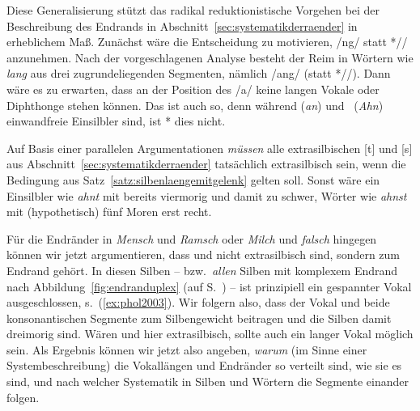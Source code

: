 Diese Generalisierung stützt das radikal reduktionistische Vorgehen bei der Beschreibung des Endrands in Abschnitt~\ref{sec:systematikderraender} in erheblichem Maß.
Zunächst wäre die Entscheidung zu motivieren, /ng/ statt *// anzunehmen.
Nach der vorgeschlagenen Analyse besteht der Reim in Wörtern wie \textit{lang} aus drei zugrundeliegenden Segmenten, nämlich /ang/ (statt *//).
Dann wäre es zu erwarten, dass an der Position des /a/ keine langen Vokale oder Diphthonge stehen können.
Das ist auch so, denn während \textipa{[Pan]} (\textit{an}) und\ \textipa{[Pa:n]} (\textit{Ahn}) einwandfreie Einsilbler sind, ist *\textipa{[Pa:N]} dies nicht.

Auf Basis einer parallelen Argumentationen \textit{müssen} alle extrasilbischen [t] und [s] aus Abschnitt~\ref{sec:systematikderraender} tatsächlich extrasilbisch sein, wenn die Bedingung aus Satz~\ref{satz:silbenlaengemitgelenk} gelten soll.
Sonst wäre ein Einsilbler wie \textit{ahnt} mit \textipa{[Pa:nt]} bereits viermorig und damit zu schwer, Wörter wie \textit{ahnst} mit (hypothetisch) fünf Moren erst recht.

Für die Endränder in \textit{Mensch} und \textit{Ramsch} oder \textit{Milch} und \textit{falsch} hingegen können wir jetzt argumentieren, dass \textipa{[S]} und \textipa{[\c{c}]} nicht extrasilbisch sind, sondern zum Endrand gehört.
In diesen Silben -- bzw.\ \textit{allen} Silben mit komplexem Endrand nach Abbildung~\ref{fig:endranduplex} (auf S.~\pageref{fig:endranduplex}) -- ist prinzipiell ein gespannter Vokal ausgeschlossen, s.\ (\ref{ex:phol2003}).
Wir folgern also, dass der Vokal und beide konsonantischen Segmente zum Silbengewicht beitragen und die Silben damit dreimorig sind.
Wären \textipa{[S]} und \textipa{[\c{c}]} hier extrasilbisch, sollte auch ein langer Vokal möglich sein.
Als Ergebnis können wir jetzt also angeben, \textit{warum} (im Sinne einer Systembeschreibung) die Vokallängen und Endränder so verteilt sind, wie sie es sind, und nach welcher Systematik in Silben und Wörtern die Segmente einander folgen.

\begin{exe}
  \ex \label{ex:phol2003}
  \begin{xlist}
  	\ex *\textipa{[mE:nS]}
  	\ex *\textipa{[ra:mS]}
  	\ex *\textipa{[mi:l\c{c}]}
  	\ex *\textipa{[fa:lS]}
  \end{xlist}
\end{exe}

